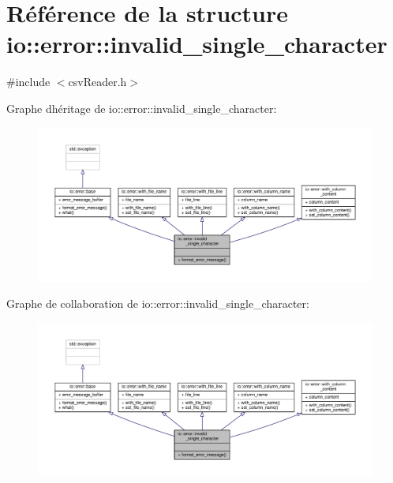 \hypertarget{structio_1_1error_1_1invalid__single__character}{}\section{Référence de la structure io\+:\+:error\+:\+:invalid\+\_\+single\+\_\+character}
\label{structio_1_1error_1_1invalid__single__character}


{\ttfamily \#include $<$csv\+Reader.\+h$>$}



Graphe d\textquotesingle{}héritage de io\+:\+:error\+:\+:invalid\+\_\+single\+\_\+character\+:
\nopagebreak
\begin{figure}[H]
\begin{center}
\leavevmode
\includegraphics[width=350pt]{structio_1_1error_1_1invalid__single__character__inherit__graph}
\end{center}
\end{figure}


Graphe de collaboration de io\+:\+:error\+:\+:invalid\+\_\+single\+\_\+character\+:
\nopagebreak
\begin{figure}[H]
\begin{center}
\leavevmode
\includegraphics[width=350pt]{structio_1_1error_1_1invalid__single__character__coll__graph}
\end{center}
\end{figure}
